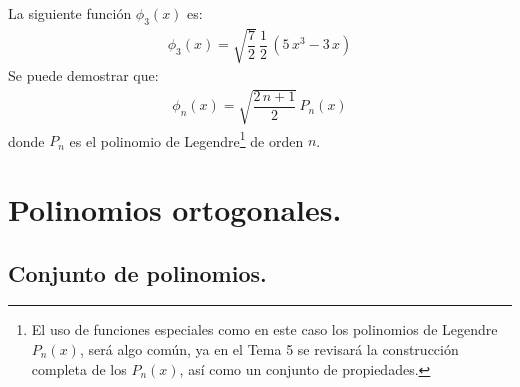 La siguiente función $\phi_{3}(x)$ es:
\begin{align}
\phi_{3} (x) = \sqrt{\dfrac{7}{2}} \, \dfrac{1}{2} \, (5 \, x^{3} - 3 \, x)
\label{eq:ecuacion_10_59}
\end{align}
Se puede demostrar que:
\begin{align}
\phi_{n}(x) = \sqrt{\dfrac{2 \, n + 1}{2}} \, P_{n}(x)
\label{eq:ecuacion_10_60}
\end{align}
donde $P_{n}$ es el polinomio de Legendre\footnote{El uso de funciones especiales como en este caso los polinomios de Legendre $P_{n}(x)$, será algo común, ya en el Tema 5 se revisará la construcción completa de los $P_{n}(x)$, así como un conjunto de propiedades.} de orden $n$.

\section{Polinomios ortogonales.}
\subsection{Conjunto de polinomios.}

